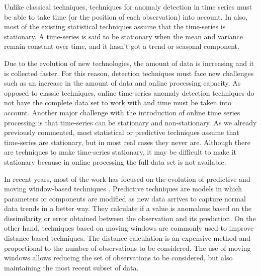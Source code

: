 \documentclass[a4paper]{article}\usepackage[]{graphicx}\usepackage[]{color}
\begin{document}
Unlike classical techniques, techniques for anomaly detection in time series must be able to take time (or the position of each observation) into account. In also, most of the existing statistical techniques assume that the time-series is stationary. A time-series is said to be stationary when the mean and variance remain constant over time, and it hasn't got a trend or seasonal component.

Due to the evolution of new technologies, the amount of data is increasing and it is collected faster. For this reason, detection techniques must face new challenges such as an increase in the amount of data and online processing capacity. As opposed to classic techniques, online time-series anomaly detection techniques do not have the complete data set to work with and time must be taken into account. Another major challenge with the introduction of online time series processing is that time-series can be stationary and non-stationary. As we already previously commented,  most statistical or predictive techniques assume that time-series are stationary, but in most real cases they never are. Although there are techniques to make time-series stationary, it may be difficult to make it stationary because in online processing the full data set is not available.

In recent years, most of the work has focused on the evolution of predictive and moving window-based techniques \cite{a3e0f1cf080343d98cae7430cd6e43c4}. Predictive techniques are models in which parameters or components are modified as new data arrives to capture normal data trends in a better way. They calculate if a value is anomalous based on the dissimilarity or error obtained between the observation and its prediction. On the other hand, techniques based on moving windows are commonly used to improve distance-based techniques. The distance calculation is an expensive method and proportional to the number of observations to be considered. The use of moving windows allows reducing the set of observations to be considered, but also maintaining the most recent subset of data.
\end{document}
